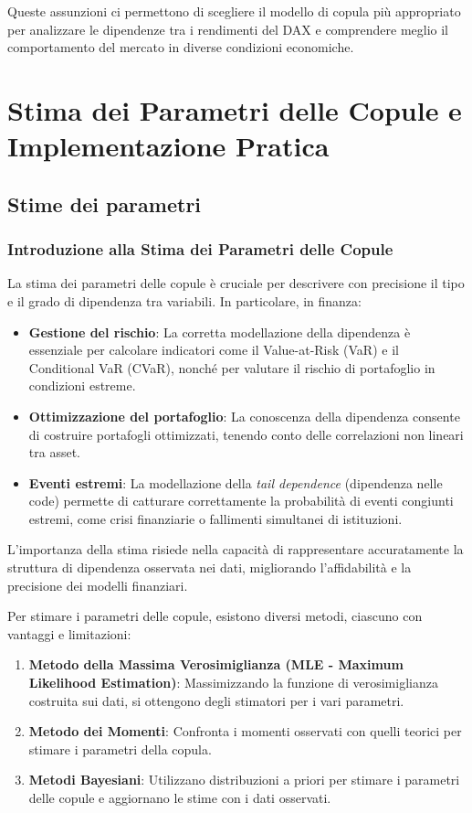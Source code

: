 \documentclass[%
	corpo=11pt,
    twoside,
    stile=classica,
    oldstyle,
    tipotesi=custom,
    greek,
    evenboxes,
]{toptesi}
\begin{document}
Queste assunzioni ci permettono di scegliere il modello di copula più appropriato per analizzare le dipendenze tra i rendimenti del DAX e comprendere meglio il comportamento del mercato in diverse condizioni economiche.




\part{Stima dei Parametri delle
	Copule e Implementazione
	Pratica}

\chapter{Stime dei parametri}

\section{Introduzione alla Stima dei Parametri delle Copule}

La stima dei parametri delle copule è cruciale per descrivere con precisione il tipo e il grado di dipendenza tra variabili. In particolare, in finanza:

\begin{itemize}
	\item \textbf{Gestione del rischio}: La corretta modellazione della dipendenza è essenziale per calcolare indicatori come il Value-at-Risk (VaR) e il Conditional VaR (CVaR), nonché per valutare il rischio di portafoglio in condizioni estreme.
	\item \textbf{Ottimizzazione del portafoglio}: La conoscenza della dipendenza consente di costruire portafogli ottimizzati, tenendo conto delle correlazioni non lineari tra asset.
	\item \textbf{Eventi estremi}: La modellazione della \textit{tail dependence} (dipendenza nelle code) permette di catturare correttamente la probabilità di eventi congiunti estremi, come crisi finanziarie o fallimenti simultanei di istituzioni.
\end{itemize}

L'importanza della stima risiede nella capacità di rappresentare accuratamente la struttura di dipendenza osservata nei dati, migliorando l'affidabilità e la precisione dei modelli finanziari.

Per stimare i parametri delle copule, esistono diversi metodi, ciascuno con vantaggi e limitazioni:

\begin{enumerate}
	\item \textbf{Metodo della Massima Verosimiglianza (MLE - Maximum Likelihood Estimation)}: Massimizzando la funzione di verosimiglianza costruita sui dati, si ottengono degli stimatori per i vari parametri.
	\item \textbf{Metodo dei Momenti}: Confronta i momenti osservati con quelli teorici per stimare i parametri della copula.
	\item \textbf{Metodi Bayesiani}: Utilizzano distribuzioni a priori per stimare i parametri delle copule e aggiornano le stime con i dati osservati.
\end{enumerate}
\end{document}
